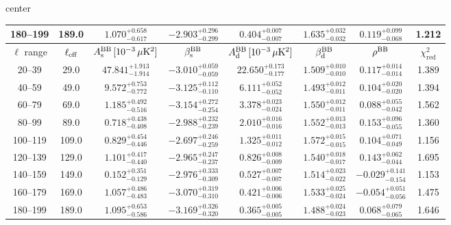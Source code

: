 \begin{table}[h]
\begin{adjustbox}{center}
\begin{tabular}{cccccccc}
180--199 & 189.0 & $1.070^{+0.658}_{-0.617}$ & $-2.903^{+0.296}_{-0.299}$ & $0.404^{+0.007}_{-0.007}$ & $1.635^{+0.032}_{-0.032}$ & $0.119^{+0.099}_{-0.068}$ & 1.212 \\
\midrule
$\ell$ range & $\ell_{\rm eff}$ & $A^{\rm BB}_{\rm s}\,[10^{-3}\,\mu\mathrm{K}^2]$ & $\beta^{\rm BB}_{\rm s}$ & $A^{\rm BB}_{\rm d}\,[10^{-3}\,\mu\mathrm{K}^2]$ & $\beta^{\rm BB}_{\rm d}$ & $\rho^{\rm BB}$ & $\chi^2_\mathrm{red}$ \\
\midrule
20--39 & 29.0 & $47.841^{+1.913}_{-1.914}$ & $-3.010^{+0.059}_{-0.059}$ & $22.650^{+0.173}_{-0.177}$ & $1.509^{+0.010}_{-0.010}$ & $0.117^{+0.014}_{-0.014}$ & 1.389 \\
40--59 & 49.0 & $9.572^{+0.753}_{-0.772}$ & $-3.125^{+0.112}_{-0.110}$ & $6.111^{+0.052}_{-0.052}$ & $1.493^{+0.012}_{-0.011}$ & $0.104^{+0.020}_{-0.020}$ & 1.394 \\
60--79 & 69.0 & $1.185^{+0.492}_{-0.516}$ & $-3.154^{+0.272}_{-0.254}$ & $3.378^{+0.023}_{-0.024}$ & $1.550^{+0.012}_{-0.011}$ & $0.088^{+0.055}_{-0.042}$ & 1.562 \\
80--99 & 89.0 & $0.718^{+0.438}_{-0.408}$ & $-2.988^{+0.232}_{-0.239}$ & $2.010^{+0.016}_{-0.016}$ & $1.552^{+0.013}_{-0.013}$ & $0.153^{+0.096}_{-0.055}$ & 1.360 \\
100--119 & 109.0 & $0.829^{+0.454}_{-0.446}$ & $-2.697^{+0.246}_{-0.259}$ & $1.325^{+0.011}_{-0.012}$ & $1.572^{+0.015}_{-0.015}$ & $0.104^{+0.071}_{-0.049}$ & 1.156 \\
120--139 & 129.0 & $1.101^{+0.417}_{-0.440}$ & $-2.965^{+0.247}_{-0.237}$ & $0.826^{+0.008}_{-0.009}$ & $1.540^{+0.018}_{-0.017}$ & $0.143^{+0.062}_{-0.044}$ & 1.695 \\
140--159 & 149.0 & $0.152^{+0.351}_{-0.129}$ & $-2.976^{+0.333}_{-0.309}$ & $0.527^{+0.007}_{-0.007}$ & $1.514^{+0.023}_{-0.022}$ & $-0.029^{+0.141}_{-0.154}$ & 1.153 \\
160--179 & 169.0 & $1.057^{+0.486}_{-0.483}$ & $-3.070^{+0.319}_{-0.310}$ & $0.421^{+0.006}_{-0.006}$ & $1.533^{+0.025}_{-0.024}$ & $-0.054^{+0.051}_{-0.056}$ & 1.475 \\
180--199 & 189.0 & $1.095^{+0.653}_{-0.586}$ & $-3.169^{+0.326}_{-0.320}$ & $0.365^{+0.005}_{-0.005}$ & $1.488^{+0.024}_{-0.023}$ & $0.068^{+0.079}_{-0.065}$ & 1.646 \\
\bottomrule
\end{tabular}
\end{adjustbox}
\end{table}

